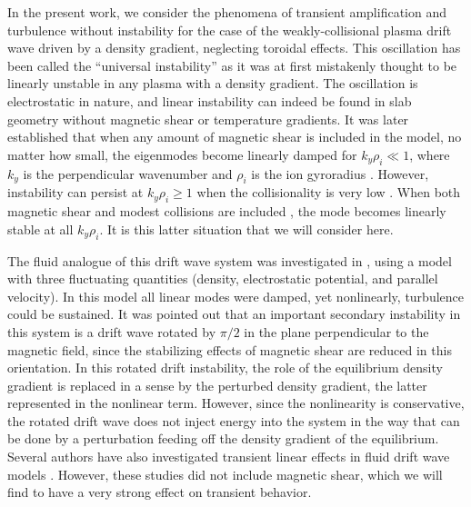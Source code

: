 \documentclass[12pt,superscriptaddress]{revtex4}
\begin{document}
In the present work, we consider the phenomena of transient amplification and turbulence
without instability for the case of the weakly-collisional
plasma drift wave driven by a density gradient\cite{Galeev,Krall3},
neglecting toroidal effects.
This oscillation has been called the ``universal instability'' as it was at first
mistakenly thought to be linearly unstable in any plasma with a density gradient.
The oscillation is electrostatic in nature, and linear instability can indeed be found
in slab geometry without magnetic shear or temperature gradients.
It was later established that when any amount of magnetic shear is included in the model,
no matter how small,
the eigenmodes become linearly damped for $k_y \rho_i \ll 1$,
where $k_y$ is the perpendicular wavenumber and $\rho_i$ is the ion gyroradius
\cite{Ross, Tsang, Antonsen}.
However, instability can persist at $k_y \rho_i \ge 1$ when the collisionality is
very low \cite{usUniversalInstability}.
When both magnetic shear and modest collisions are included \cite{usUniversalInstability},
the mode becomes linearly stable at all $k_y \rho_i$.
It is this latter situation that we will consider here.

The fluid analogue of this drift wave system was investigated in \cite{Drake},
using a model with three fluctuating quantities (density, electrostatic potential, and parallel velocity).
In this model all linear modes were damped, yet nonlinearly, turbulence could be sustained.
It was pointed out that an important secondary
instability in this system is a drift wave rotated by $\pi/2$ in the plane
perpendicular to the magnetic field, since the stabilizing effects of magnetic
shear are reduced in this orientation.
In this rotated drift instability, the role of the equilibrium density gradient is replaced in a sense by the
perturbed density gradient, the latter represented in the nonlinear term.
However, since the nonlinearity is conservative, the rotated drift wave does not inject energy
into the system in the way that can be done by a perturbation feeding off the density gradient of the equilibrium.
Several authors have also investigated transient linear effects in fluid drift wave models
\cite{Camargo, Friedman1, Friedman2}. However, these studies did not
include magnetic shear, which we will find to have a very strong effect on
transient behavior.
\end{document}
